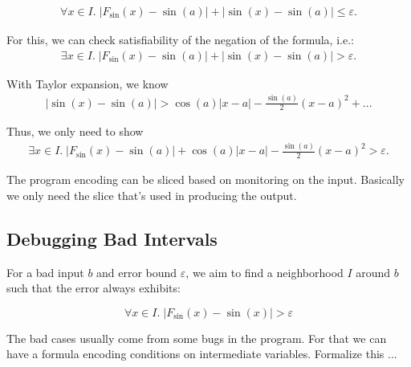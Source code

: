 \begin{eqnarray}
\forall x\in I.\; |F_{\sin}(x) - \sin(a)| + |\sin(x) - \sin(a)| \leq \varepsilon.
\end{eqnarray}

For this, we can check satisfiability of the negation of the formula, i.e.:
\begin{eqnarray}
\exists x\in I.\; |F_{\sin}(x) - \sin(a)| + |\sin(x) - \sin(a)| > \varepsilon.
\end{eqnarray}

With Taylor expansion, we know
\begin{eqnarray}
|\sin(x) - \sin(a)| > \cos(a) |x - a| - \frac{\sin(a)}{2}(x-a)^2 + ... %
\end{eqnarray}

Thus, we only need to show
\begin{eqnarray}
\exists x\in I.\; |F_{\sin}(x) - \sin(a)| + \cos(a) |x - a| -
\frac{\sin(a)}{2}(x-a)^2 > \varepsilon.
\end{eqnarray}

The program encoding can be sliced based on monitoring on the input.
Basically we only need the slice that's used in producing the output.

\subsection{Debugging Bad Intervals}

For a bad input $b$ and error bound $\varepsilon$, we aim to find a
neighborhood $I$ around $b$ such that the error always exhibits:

$$ \forall x\in I.\; |F_{\sin}(x) - \sin(x)| > \varepsilon$$

The bad cases usually come from some bugs in the program. For that we
can have a formula encoding conditions on intermediate variables.
Formalize this ...

